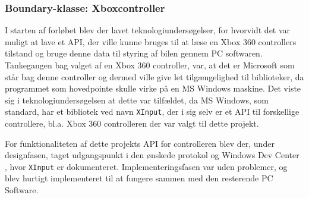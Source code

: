 \subsubsection{Boundary-klasse: Xboxcontroller} \label{sec:controller}
I starten af forløbet blev der lavet teknologiundersøgelser, for hvorvidt det var muligt at lave et API, der ville kunne bruges til at læse en Xbox 360 controllers tilstand og bruge denne data til styring af bilen gennem PC softwaren. 
Tankegangen bag valget af en Xbox 360 controller, var, at det er Microsoft som står bag denne controller og dermed ville give let tilgængelighed til biblioteker, da programmet som hovedpointe skulle virke på en MS Windows maskine. 
Det viste sig i teknologiundersøgelsen at dette var tilfældet, da MS Windows, som standard, har et bibliotek ved navn \texttt{XInput}, der i sig selv er et API til forskellige controllere, bl.a. Xbox 360 controlleren der var valgt til dette projekt.

For funktionaliteten af dette projekts API for controlleren blev der, under designfasen, taget udgangspunkt i den ønskede protokol og Windows Dev Center \cite{lib:windows_xinput}, hvor \texttt{XInput} er dokumenteret. 
Implementeringsfasen var uden problemer, og blev hurtigt implementeret til at fungere sammen med den resterende PC Software.